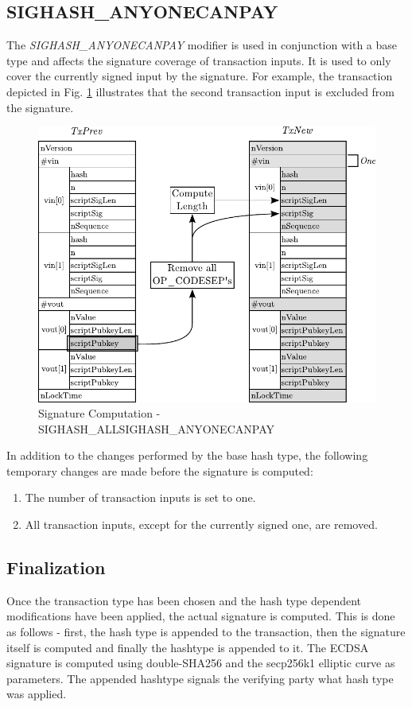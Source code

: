 \clearpage
\subsection*{SIGHASH\_ANYONECANPAY}
The \emph{SIGHASH\_ANYONECANPAY} modifier is used in conjunction with a base type and affects the signature coverage of transaction inputs. It is used to only cover the currently signed input by the signature. For example, the transaction depicted in Fig. \ref{fig:SigHash-Anyone} illustrates that the second transaction input is excluded from the signature.

\begin{figure}[ht!]
 \centering
 \includegraphics[scale=0.975]{Images/SIGHASH_ANYONECANPAY.pdf}
 \caption{Signature Computation - SIGHASH\_ALL\textbar SIGHASH\_ANYONECANPAY} \label{fig:SigHash-Anyone}
\end{figure}

\noindent
In addition to the changes performed by the base hash type, the following temporary changes are made before the signature is computed:
\begin{enumerate}[label=\alph*), leftmargin=1cm]
\item The number of transaction inputs is set to one.
\item All transaction inputs, except for the currently signed one, are removed.
\end{enumerate}

\clearpage
\subsection*{Finalization}
Once the transaction type has been chosen and the hash type dependent modifications have been applied, the actual signature is computed. This is done as follows - first, the hash type is appended to the transaction, then the signature itself is computed and finally the hashtype is appended to it. The ECDSA signature is computed using double-SHA256 and the secp256k1 elliptic curve as parameters. The appended hashtype signals the verifying party what hash type was applied.

